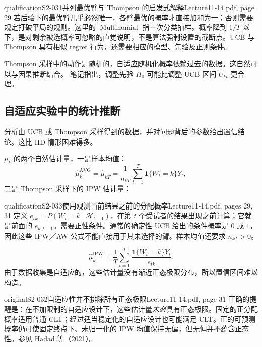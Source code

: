 \begin{reviewnote}{qualification}{S2-031}{并列最优臂与 Thompson 的启发式解释}{Lecture11-14.pdf, page 29}
若后验下的最优臂几乎必然唯一，各臂最优的概率才直接加和为一；否则需要规定打破平局的规则。这里的 $\operatorname{Multinomial}$ 指一次分类抽样。概率降到 $1/T$ 以下，是对剩余被选概率可忽略的直觉说明，不是算法强制设置的截断点。UCB 与 Thompson 具有相似 regret 行为，还需要相应的模型、先验及正则条件。
\end{reviewnote}


Thompson 采样中的动作是随机的，自适应随机化概率依赖过去的数据。这自然可以与因果推断结合。
笔记指出，调整先验 $\Pi_0$ 可能比调整 UCB 区间 $\widehat U_{kt}$ 更合理。

\subsection{自适应实验中的统计推断}
分析由 UCB 或 Thompson 采样得到的数据，并对问题背后的参数给出置信结论。这比 IID 情形困难得多。

$\mu_k$ 的两个自然估计量，一是样本均值：
\[
 \widehat\mu_k^{\mathrm{AVG}}=\widehat\mu_{kT}
 =\frac1{n_{kT}}\sum_{t=1}^T\mathbf1\{W_t=k\}Y_t,\tag{14.11}
\]
二是 Thompson 采样下的 IPW 估计量：

\begin{reviewnote}{qualification}{S2-033}{使用观测当前结果之前的分配概率}{Lecture11-14.pdf, pages 29, 31}
定义 $e_{tk}=P(W_t=k\mid\mathcal H_{t-1})$，在第 $t$ 个受试者的结果出现之前计算；它就是前面的 $e_{k,t-1}$。需要正性条件。通常的确定性 UCB 给出的条件概率是 $0$ 或 $1$，因此这些 IPW／AW 公式不能直接用于其未选择的臂。样本均值还要求 $n_{kT}>0$。
\end{reviewnote}

\[
 \widehat\mu_k^{\mathrm{IPW}}=\frac1T\sum_{t=1}^T
 \frac{\mathbf1\{W_t=k\}Y_t}{e_{tk}}.\tag{14.12}
\]
由于数据收集是自适应的，这些估计量没有渐近正态极限分布，所以置信区间难以构造。
\begin{reviewnote}{original}{S2-032}{自适应性并不排除所有正态极限}{Lecture11-14.pdf, page 31}
正确的提醒是：在不加限制的自适应设计下，这些估计量\emph{未必}具有正态极限。固定的正分配概率适用普通 CLT；经过适当稳定化的自适应设计也可能满足 CLT。正的可预测概率仍可使固定终点下、未归一化的 IPW 均值保持无偏，但无偏并不蕴含正态性。参见 \href{https://pmc.ncbi.nlm.nih.gov/articles/PMC8054003/}{Hadad 等（2021）}。
\end{reviewnote}


